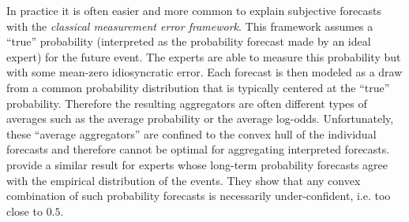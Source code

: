 \documentclass[11pt]{article}
\theoremstyle{definition}
\theoremstyle{definition}
\begin{document}
In practice it is often easier and more common to explain subjective forecasts with the \textit{classical measurement error framework}. This framework assumes a ``true'' probability (interpreted as the probability forecast made by an ideal expert) for the future event. The experts are able to measure this probability but with some mean-zero idiosyncratic error. Each forecast is then modeled as a draw from a common probability distribution that is typically centered at the ``true'' probability. Therefore the resulting aggregators are often different types of averages such as the average probability or the average log-odds. 
Unfortunately, these ``average aggregators'' are confined to the convex hull of the individual forecasts and therefore cannot be optimal for aggregating interpreted forecasts. \cite{Ranjan08} provide a similar result for experts whose long-term probability forecasts agree with the empirical distribution of the events. 
They show that any convex combination of such probability forecasts is necessarily under-confident, i.e. too close to $0.5$. 
  
\end{document}
